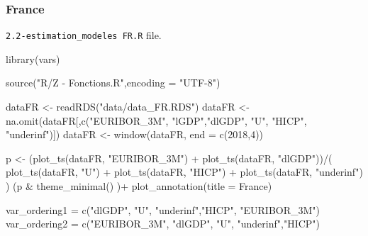 \documentclass[
  10pt,
]{article}
\newenvironment{Shaded}{\begin{snugshade}}{\end{snugshade}}
\newcommand{\AttributeTok}[1]{\textcolor[rgb]{0.77,0.63,0.00}{#1}}
\newcommand{\DecValTok}[1]{\textcolor[rgb]{0.00,0.00,0.81}{#1}}
\newcommand{\FunctionTok}[1]{\textcolor[rgb]{0.00,0.00,0.00}{#1}}
\newcommand{\NormalTok}[1]{#1}
\newcommand{\OtherTok}[1]{\textcolor[rgb]{0.56,0.35,0.01}{#1}}
\newcommand{\SpecialCharTok}[1]{\textcolor[rgb]{0.00,0.00,0.00}{#1}}
\newcommand{\StringTok}[1]{\textcolor[rgb]{0.31,0.60,0.02}{#1}}
\begin{document}
\hypertarget{france}{%
\subsubsection{France}\label{france}}

\texttt{2.2-estimation\_modeles\ FR.R} file.

\begin{Shaded}
\begin{Highlighting}[]
\FunctionTok{library}\NormalTok{(vars)}

\FunctionTok{source}\NormalTok{(}\StringTok{"R/Z {-} Fonctions.R"}\NormalTok{,}\AttributeTok{encoding =} \StringTok{"UTF{-}8"}\NormalTok{)}

\NormalTok{dataFR }\OtherTok{\textless{}{-}} \FunctionTok{readRDS}\NormalTok{(}\StringTok{"data/data\_FR.RDS"}\NormalTok{)}
\NormalTok{dataFR }\OtherTok{\textless{}{-}} \FunctionTok{na.omit}\NormalTok{(dataFR[,}\FunctionTok{c}\NormalTok{(}\StringTok{"EURIBOR\_3M"}\NormalTok{, }\StringTok{"lGDP"}\NormalTok{,}\StringTok{"dlGDP"}\NormalTok{,}
                            \StringTok{"U"}\NormalTok{, }\StringTok{"HICP"}\NormalTok{, }\StringTok{"underinf"}\NormalTok{)])}
\NormalTok{dataFR }\OtherTok{\textless{}{-}} \FunctionTok{window}\NormalTok{(dataFR, }\AttributeTok{end =} \FunctionTok{c}\NormalTok{(}\DecValTok{2018}\NormalTok{,}\DecValTok{4}\NormalTok{))}

\NormalTok{p }\OtherTok{\textless{}{-}}\NormalTok{ (}\FunctionTok{plot\_ts}\NormalTok{(dataFR, }\StringTok{"EURIBOR\_3M"}\NormalTok{) }\SpecialCharTok{+}
          \FunctionTok{plot\_ts}\NormalTok{(dataFR, }\StringTok{"dlGDP"}\NormalTok{))}\SpecialCharTok{/}\NormalTok{(}
              \FunctionTok{plot\_ts}\NormalTok{(dataFR, }\StringTok{"U"}\NormalTok{) }\SpecialCharTok{+} 
                  \FunctionTok{plot\_ts}\NormalTok{(dataFR, }\StringTok{"HICP"}\NormalTok{) }\SpecialCharTok{+} 
                  \FunctionTok{plot\_ts}\NormalTok{(dataFR, }\StringTok{"underinf"}\NormalTok{)}
\NormalTok{              )}
\NormalTok{(p }\SpecialCharTok{\&} \FunctionTok{theme\_minimal}\NormalTok{() )}\SpecialCharTok{+} 
    \FunctionTok{plot\_annotation}\NormalTok{(}\AttributeTok{title =} \StringTok{\textquotesingle{}France\textquotesingle{}}\NormalTok{)}

\NormalTok{var\_ordering1 }\OtherTok{=} \FunctionTok{c}\NormalTok{(}\StringTok{"dlGDP"}\NormalTok{,}
                 \StringTok{"U"}\NormalTok{, }\StringTok{"underinf"}\NormalTok{,}\StringTok{"HICP"}\NormalTok{, }\StringTok{"EURIBOR\_3M"}\NormalTok{)}
\NormalTok{var\_ordering2 }\OtherTok{=} \FunctionTok{c}\NormalTok{(}\StringTok{"EURIBOR\_3M"}\NormalTok{, }\StringTok{"dlGDP"}\NormalTok{,}
                 \StringTok{"U"}\NormalTok{, }\StringTok{"underinf"}\NormalTok{,}\StringTok{"HICP"}\NormalTok{)}


\end{Highlighting}
\end{Shaded}
\end{document}
